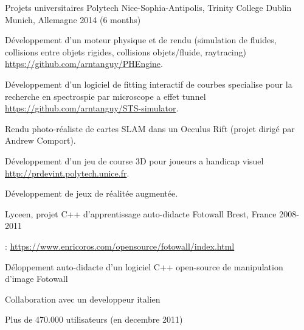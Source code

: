 \begin{cventries}
  \cventry
    {Projets universitaires} %
    {Polytech Nice-Sophia-Antipolis, Trinity College Dublin} %
    {Munich, Allemagne} %
    {2014 (6 months)} %
    {
      \begin{cvitems} %
        \item Développement d'un moteur physique et de rendu (simulation de fluides, collisions entre objets rigides, collisions objets/fluide, raytracing)\\\url{https://github.com/arntanguy/PHEngine}.
        \item Développement d'un logiciel de fitting interactif de courbes specialise pour la recherche en spectrospie par microscope a effet tunnel\\\url{https://github.com/arntanguy/STS-simulator}. 
        \item Rendu photo-réaliste de cartes SLAM dans un Occulus Rift (projet dirigé par Andrew Comport).
        \item Développement d'un jeu de course 3D pour joueurs a handicap visuel\\\url{http://prdevint.polytech.unice.fr}. 
        \item Développement de jeux de réalitée augmentée.
      \end{cvitems}
    }

  \cventry
    {Lyceen, projet C++ d'apprentissage auto-didacte} %
    {Fotowall} %
    {Brest, France} %
    {2008-2011} %
    {
      \begin{cvitems} %
        \item {}: \url{https://www.enricoros.com/opensource/fotowall/index.html}
        \item Déloppement auto-didacte d'un logiciel C++ open-source de manipulation d'image Fotowall
        \item Collaboration avec un developpeur italien
        \item Plus de 470.000 utilisateurs (en decembre 2011)
      \end{cvitems}
    }

\end{cventries}
